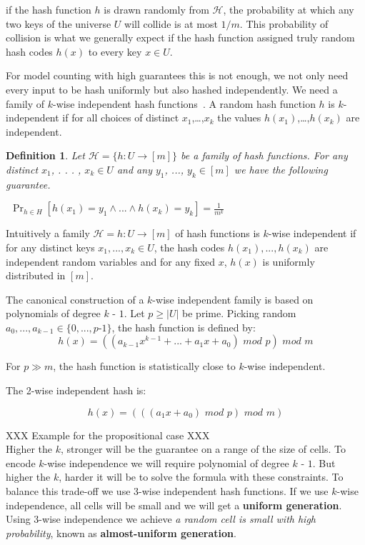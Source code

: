 \documentclass{article}
\newtheorem{definition}{Definition}
\newcommand{\hash}{$\mathcal{H}$}
\begin{document}
if the hash function $h$ is drawn randomly from \hash, the probability at which any two keys of the universe $U$ will collide is at most $1/m$.
%
This probability of collision is what we generally expect if the hash function assigned truly random hash codes $h(x)$ to every key $x \in U$.

For model counting with high guarantees this is not enough, we not only need every input to be hash uniformly but also hashed independently. We need a family of $k$-wise independent hash functions~\cite{DBLP:conf/focs/WegmanC79}.
%
A random hash function $h$ is $k$-independent if for all choices of distinct $x_1$,…,$x_k$ the values $h(x_1)$,…,$h(x_k)$ are independent.
\begin{definition}
	Let $\mathcal{H}=\{h: U \to [m]\}$ be a family of hash functions. For any distinct $x_1$, . . . , $x_k \in U$ and any $y_1$, ..., $y_k \in [m]$ we have the following guarantee.

	$~~\Pr_{h\in H}
	[h(x_1) = y_1 \land ... \land h(x_k) = y_k] = \frac {1}
	{m^
		k}$
\end{definition}

Intuitively a family $\mathcal{H} = {h : U \to [m]}$ of hash functions
is $k$-wise independent if for any distinct keys $x_1, ..., x_k \in U$, the hash codes $h(x_1), ..., h(x_k)$ are independent random variables and for any fixed $x$, $h(x)$ is uniformly distributed in $[m]$.

The canonical construction of a $k$-wise independent family is based on polynomials
of degree $k$ - $1$. Let $p \geq |U|$ be prime. Picking random $a_0,...,a_{k - 1} \in \{0, . . . , p$-$ 1\}$,
the hash function is defined by:
\[ h(x) = ( ( a_{k-1} x^ {k - 1} + ... + a_1 x + a_0) \,\, mod \,\, p) \,\, mod \,\,  m\]


For $p \gg	 m$, the hash function is statistically close to $k$-wise independent.

The 2-wise independent hash is:

\[ h(x) = (((a_1 x + a_0) \,\, mod \,\, p) \,\, mod \,\, m ) \]

XXX Example for the propositional case XXX \\

Higher the $k$, stronger will be the guarantee on a range of the size of cells. 
%
To encode $k$-wise independence we will require polynomial of degree $k$ - $1$.
%
But higher the $k$, harder it will be to solve the formula with these constraints. 
%
To balance this trade-off we use 3-wise independent hash functions.
%
If we use $k$-wise independence, all cells will be small and we will get a \textbf{uniform generation}. 
%
Using $3$-wise independence we achieve \emph{a random cell is small with high probability}, known as \textbf{almost-uniform generation}.
\end{document}
